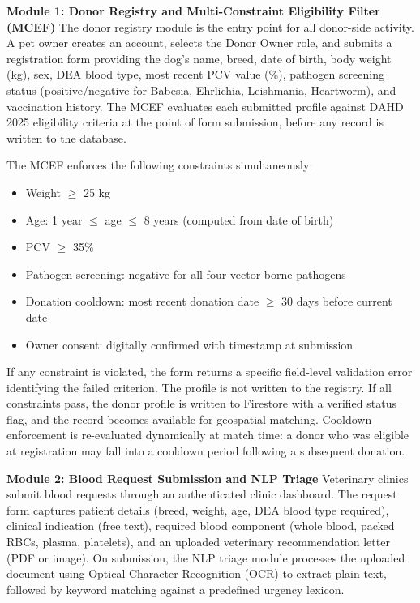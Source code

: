 \documentclass[12pt,a4paper]{article}
\begin{document}
\noindent\textbf{Module 1: Donor Registry and Multi-Constraint Eligibility Filter (MCEF)}
\noindent The donor registry module is the entry point for all donor-side activity. A pet owner creates an account, selects the Donor Owner role, and submits a registration form providing the dog's name, breed, date of birth, body weight (kg), sex, DEA blood type, most recent PCV value (\%), pathogen screening status (positive/negative for Babesia, Ehrlichia, Leishmania, Heartworm), and vaccination history. The MCEF evaluates each submitted profile against DAHD 2025 eligibility criteria at the point of form submission, before any record is written to the database.

\noindent The MCEF enforces the following constraints simultaneously:

\begin{itemize}[leftmargin=1.5em, itemsep=0.3em]
    \item Weight $\geq$ 25 kg
    \item Age: 1 year $\leq$ age $\leq$ 8 years (computed from date of birth)
    \item PCV $\geq$ 35\%
    \item Pathogen screening: negative for all four vector-borne pathogens
    \item Donation cooldown: most recent donation date $\geq$ 30 days before current date
    \item Owner consent: digitally confirmed with timestamp at submission
\end{itemize}

\noindent If any constraint is violated, the form returns a specific field-level validation error identifying the failed criterion. The profile is not written to the registry. If all constraints pass, the donor profile is written to Firestore with a verified status flag, and the record becomes available for geospatial matching. Cooldown enforcement is re-evaluated dynamically at match time: a donor who was eligible at registration may fall into a cooldown period following a subsequent donation.

\noindent\textbf{Module 2: Blood Request Submission and NLP Triage}
\noindent Veterinary clinics submit blood requests through an authenticated clinic dashboard. The request form captures patient details (breed, weight, age, DEA blood type required), clinical indication (free text), required blood component (whole blood, packed RBCs, plasma, platelets), and an uploaded veterinary recommendation letter (PDF or image). On submission, the NLP triage module processes the uploaded document using Optical Character Recognition (OCR) to extract plain text, followed by keyword matching against a predefined urgency lexicon.
\end{document}
